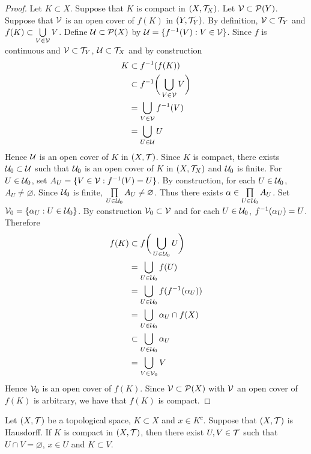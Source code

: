 \documentclass{book}
\begin{document}
	\begin{proof}
		Let $K \subset X$. Suppose that $K$ is compact in $(X, \mathcal{T}_X)$. Let $\mathcal{V} \subset \mathcal{P}(Y)$. Suppose that $\mathcal{V}$ is an open cover of $f(K)$ in $(Y, \mathcal{T}_Y)$. By definition, $\mathcal{V} \subset \mathcal{T}_Y$ and $f(K) \subset \bigcup\limits_{V \in \mathcal{V}} V$. Define $\mathcal{U} \subset \mathcal{P}(X)$ by $\mathcal{U} = \{f^{-1}(V):V \in \mathcal{V}\}$. Since $f$ is continuous and $\mathcal{V} \subset \mathcal{T}_Y$, $\mathcal{U} \subset \mathcal{T}_X$ and by construction
		\begin{align*}
			K
			& \subset f^{-1}(f(K)) \\
			& \subset f^{-1}\bigg( \bigcup\limits_{V \in \mathcal{V}} V \bigg) \\
			& = \bigcup\limits_{V \in \mathcal{V}} f^{-1}(V) \\
			& = \bigcup\limits_{U \in \mathcal{U}} U \\
		\end{align*}
		Hence $\mathcal{U}$ is an open cover of $K$ in $(X, \mathcal{T})$. Since $K$ is compact, there exists $\mathcal{U}_0 \subset \mathcal{U}$ such that $\mathcal{U}_0$ is an open cover of $K$ in $(X, \mathcal{T}_X)$ and $\mathcal{U}_0$ is finite. For $U \in \mathcal{U}_0$, set $A_U = \{V \in \mathcal{V}: f^{-1}(V) = U \}$. By construction, for each $U \in \mathcal{U}_0$, $A_U \neq \varnothing$. Since $\mathcal{U}_0$ is finite, $\prod\limits_{U \in \mathcal{U}_0} A_U \neq \varnothing$. Thus there exists $\alpha \in \prod\limits_{U \in \mathcal{U}_0} A_U$. Set $\mathcal{V}_0 = \{\alpha_U: U \in \mathcal{U}_0\}$. By construction $\mathcal{V}_0 \subset \mathcal{V}$ and for each $U \in \mathcal{U}_0$, $f^{-1}(\alpha_U) = U$. Therefore 
		\begin{align*}
			f(K)
			& \subset f \bigg( \bigcup\limits_{U \in \mathcal{U}_0} U \bigg) \\
			& = \bigcup\limits_{U \in \mathcal{U}_0} f(U) \\
			& = \bigcup\limits_{U \in \mathcal{U}_0} f (f^{-1}(\alpha_U)) \\
			& = \bigcup\limits_{U \in \mathcal{U}_0} \alpha_U \cap f(X) \\
			& \subset \bigcup\limits_{U \in \mathcal{U}_0} \alpha_U \\
			& = \bigcup\limits_{V \in \mathcal{V}_0} V \\
		\end{align*}
		Hence $\mathcal{V}_0$ is an open cover of $f(K)$. Since $\mathcal{V} \subset \mathcal{P}(X)$ with $\mathcal{V}$ an open cover of $f(K)$ is arbitrary, we have that $f(K)$ is compact.
	\end{proof}
	
	\begin{ex}
		Let $(X, \mathcal{T})$ be a topological space, $K \subset X$ and $x \in K^c$. Suppose that $(X, \mathcal{T})$ is Hausdorff. If $K$ is compact in $(X, \mathcal{T})$, then there exist $U, V \in \mathcal{T}$ such that $U \cap V = \varnothing$, $x \in U$ and $K \subset V$.
	\end{ex}
\end{document}
